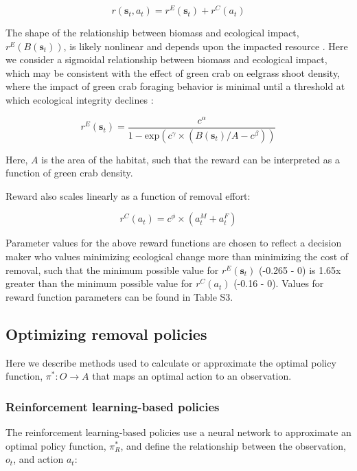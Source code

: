 \documentclass{article}
\begin{document}
\begin{equation}
r(\textbf{s}_t, a_t) = r^E(\textbf{s}_t) + r^C(a_t)
\end{equation}

The shape of the relationship between biomass and ecological impact, $r^E(B(\textbf{s}_t))$, is likely nonlinear and depends upon the impacted resource \parencite{bradley2019disentangling, grosholz2000impacts}. Here we consider a sigmoidal relationship between biomass and ecological impact, which may be consistent with the effect of green crab on eelgrass shoot density, where the impact of green crab foraging behavior is minimal until a threshold at which ecological integrity declines \parencite{davis1998quantifying}:

\begin{equation}
r^E(\textbf{s}_t) = \frac{c^\alpha}{1 - \text{exp}(c^\gamma \times(B(\textbf{s}_t) /A-c^\beta))}
\end{equation}

Here, $A$ is the area of the habitat, such that the reward can be interpreted as a function of green crab density.

Reward also scales linearly as a function of removal effort:

\begin{equation}
r^C(a_t) = c^\phi\times(a_t^M + a_t^F)
\end{equation}

Parameter values for the above reward functions are chosen to reflect a decision maker who values minimizing ecological change more than minimizing the cost of removal, such that the minimum possible value for $r^E(\textbf{s}_t)$ (-0.265 - 0) is 1.65x greater than the minimum possible value for $r^C(a_t)$ (-0.16 - 0). Values for reward function parameters can be found in Table S3.

\subsection{Optimizing removal policies}

Here we describe methods used to calculate or approximate the optimal policy function, $\pi^*: O \rightarrow A$ that maps an optimal action to an observation.

\subsubsection{Reinforcement learning-based policies}

The reinforcement learning-based policies use a neural network to approximate an optimal policy function, $\pi^*_R$, and define the relationship between the observation, $o_t$, and action $a_t$:
\end{document}
